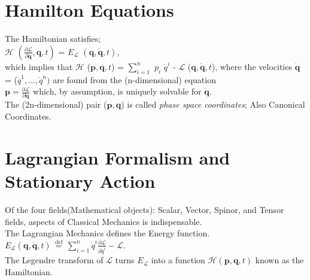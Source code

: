 \documentclass[a4paper, 10pt, onepage]{elegantbook}
\begin{document}
\newpage

\section{Hamilton Equations}

The Hamiltonian satisfies;  \\

$\mathcal {H}$ $\left(\frac{\partial \mathcal{L}}{\partial \boldsymbol \dot{q}}, {\boldsymbol {q}},t \right)$ = $E_{\mathcal{L}}$ $({\boldsymbol {q}},{\boldsymbol {\dot{q}}},t)$, \\

which implies that $\mathcal{H}$ (${\boldsymbol {p}},{\boldsymbol {q}},t$) = $\sum_{i=1}^{n}$ $p_{i}$ ${\dot{q}}^{i}$ - $\mathcal{L}$ ($\boldsymbol {q},\boldsymbol \dot{q},t$), where the velocities $\boldsymbol \dot{q}$ = (${\dot{q}}^{1}, \ldots, \dot{q}^{n})$ are found from the (n-dimensional) equation  \\


$\mathbf{p} = \frac{\partial \mathcal{L}}{\partial \mathbf{\dot{q}}}$ which, by assumption, is uniquely solvable for $\mathbf{\dot{q}}$. \\

The (2n-dimensional) pair ($\boldsymbol {p},\boldsymbol {q}$) is called \emph{phase space coordinates}; Also Canonical Coordinates.

\section{Lagrangian Formalism and Stationary Action}
\label{sec:Lagrangian Formalism and Stationary Action}

Of the four fields(Mathematical objects): Scalar, Vector, Spinor, and Tensor fields, aspects of Classical Mechanics is indispensable.  \\

The Lagrangian Mechanics defines the Energy function.  \\

$E_{\mathcal {L}}({\boldsymbol {q}},{\boldsymbol {\dot {q}}},t)\,{\stackrel {\text{def}}{=}}\,\sum _{i=1}^{n}{\dot {q}}^{i}{\frac {\partial {\mathcal {L}}}{\partial {\dot {q}}^{i}}}-{\mathcal {L}}$.  \\

The Legendre transform of ${\mathcal {L}}$ turns ${E_{\mathcal {L}}}$ into a function ${\mathcal {H}}({\boldsymbol {p}},{\boldsymbol {q}},t)$ known as the Hamiltonian. \\
\end{document}
